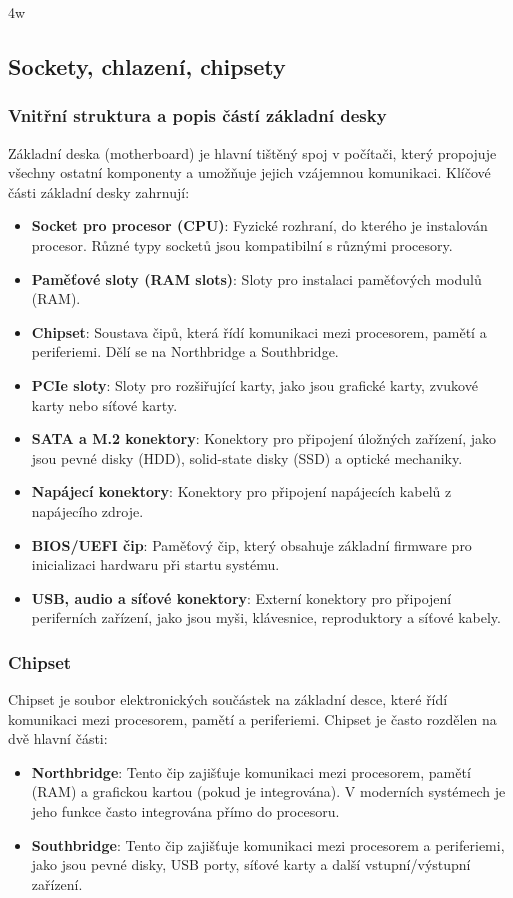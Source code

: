 4w\subsection{Sockety, chlazení, chipsety}

\subsubsection{Vnitřní struktura a popis částí základní desky}
Základní deska (motherboard) je hlavní tištěný spoj v počítači, který propojuje všechny ostatní komponenty a umožňuje jejich vzájemnou komunikaci. Klíčové části základní desky zahrnují:

\begin{itemize}
\item \textbf{Socket pro procesor (CPU)}: Fyzické rozhraní, do kterého je instalován procesor. Různé typy socketů jsou kompatibilní s různými procesory.
\item \textbf{Paměťové sloty (RAM slots)}: Sloty pro instalaci paměťových modulů (RAM).
\item \textbf{Chipset}: Soustava čipů, která řídí komunikaci mezi procesorem, pamětí a periferiemi. Dělí se na Northbridge a Southbridge.
\item \textbf{PCIe sloty}: Sloty pro rozšiřující karty, jako jsou grafické karty, zvukové karty nebo síťové karty.
\item \textbf{SATA a M.2 konektory}: Konektory pro připojení úložných zařízení, jako jsou pevné disky (HDD), solid-state disky (SSD) a optické mechaniky.
\item \textbf{Napájecí konektory}: Konektory pro připojení napájecích kabelů z napájecího zdroje.
\item \textbf{BIOS/UEFI čip}: Paměťový čip, který obsahuje základní firmware pro inicializaci hardwaru při startu systému.
\item \textbf{USB, audio a síťové konektory}: Externí konektory pro připojení periferních zařízení, jako jsou myši, klávesnice, reproduktory a síťové kabely.
\end{itemize}

\subsubsection{Chipset}
Chipset je soubor elektronických součástek na základní desce, které řídí komunikaci mezi procesorem, pamětí a periferiemi. Chipset je často rozdělen na dvě hlavní části:

\begin{itemize}
\item \textbf{Northbridge}: Tento čip zajišťuje komunikaci mezi procesorem, pamětí (RAM) a grafickou kartou (pokud je integrována). V moderních systémech je jeho funkce často integrována přímo do procesoru.
\item \textbf{Southbridge}: Tento čip zajišťuje komunikaci mezi procesorem a periferiemi, jako jsou pevné disky, USB porty, síťové karty a další vstupní/výstupní zařízení.
\end{itemize}

